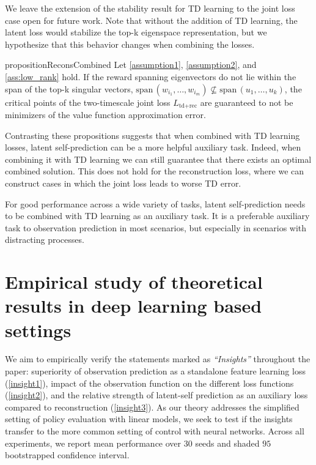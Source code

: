 We leave the extension of the stability result for TD learning to the joint loss case open for future work.
Note that without the addition of TD learning, the latent loss would stabilize the top-k eigenspace representation, but we hypothesize that this behavior changes when combining the losses.

\begin{restatable}{proposition}{ReconsCombined}
    Let \autoref{assumption1}, \autoref{assumption2}, and \autoref{ass:low_rank} hold. If the reward spanning eigenvectors do not lie within the span of the top-k singular vectors, $\mathrm{span}\,(w_{i_1},\dots,w_{i_m}) \not\subseteq \mathrm{span}\,(u_1,\dots,u_k)$, the critical points of the two-timescale joint loss $L_{\text{td}+\text{rec}}$ are guaranteed to not be minimizers of the value function approximation error. 
\end{restatable}

Contrasting these propositions suggests that when combined with TD learning losses, latent self-prediction can be a more helpful auxiliary task. Indeed, when combining it with TD learning we can still guarantee that there exists an optimal combined solution.
This does not hold for the reconstruction loss, where we can construct cases in which the joint loss leads to worse TD error.

\begin{tcolorbox}[boxrule=0.2mm,colback=white,colframe=uoftblue,boxsep=0pt,top=3pt,bottom=5pt]
\begin{insight} 
For good performance across a wide variety of tasks, latent self-prediction needs to be combined with TD learning as an auxiliary task. It is a preferable auxiliary task to observation prediction in most scenarios, but especially in scenarios with distracting processes.
\label{insight3}
\end{insight}
\end{tcolorbox}

\section{Empirical study of theoretical results in deep learning based settings}
\label{sec:empirical}

We aim to empirically verify the statements marked as \emph{``Insights''} throughout the paper: superiority of observation prediction as a standalone feature learning loss (\autoref{insight1}), impact of the observation function on the different loss functions (\autoref{insight2}), and the relative strength of latent-self prediction as an auxiliary loss compared to reconstruction (\autoref{insight3}). 
As our theory addresses the simplified setting of policy evaluation with linear models, we seek to test if the insights transfer to the more common setting of control with neural networks.
Across all experiments, we report mean performance over 30 seeds and shaded $95$ bootstrapped confidence interval.

